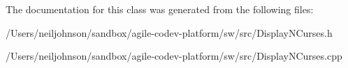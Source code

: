 The documentation for this class was generated from the following files\+:\begin{DoxyCompactItemize}
\item 
/\+Users/neiljohnson/sandbox/agile-\/codev-\/platform/sw/src/Display\+N\+Curses.\+h\item 
/\+Users/neiljohnson/sandbox/agile-\/codev-\/platform/sw/src/Display\+N\+Curses.\+cpp\end{DoxyCompactItemize}
